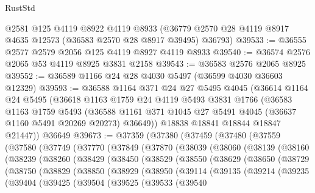 \begin{lexlean}{RustStd}
\begin{coremodule}
    @2581
    @125
    @4119
    @8922
    @4119
    @8933
    (@36779 @2570 @28 @4119 @8917 @4635 @12573 (@36583 @2570 @28 @8917 @39495) @36793)
@39533 := @36555 @2577 @2579 @2056 @125 @4119 @8927 @4119 @8933
@39540 := @36574 @2576 @2065 @53 @4119 @8925 @3831 @2158
@39543 := @36583 @2576 @2065 @8925
@39552 := @36589 @1166 @24 @28 @4030 @5497 (@36599 @4030 @36603 @12329)
@39593 := @36588
    @1164
    @371
    @24
    @27
    @5495
    @4045
    (@36614
      @1164
      @24
      @5495
      (@36618
        @1163
        @1759
        @24
        @4119
        @5493
        @3831
        @1766
        (@36583
          @1163
          @1759
          @5493
          (@36588 @1161 @371 @1045 @27 @5491 @4045 (@36637 @1160 @5491 @20269 @20273) @36649))
        @18838
        @18841
        @18844
        @18847
        @21447))
    @36649
@39673 := @37359
    (@37380
      (@37459
        (@37480
          (@37559
            (@37580
              (@37749
                (@37770
                  (@37849
                    (@37870
                      (@38039
                        (@38060
                          (@38139
                            (@38160
                              (@38239
                                (@38260
                                  (@38429
                                    (@38450
                                      (@38529
                                        (@38550
                                          (@38629
                                            (@38650
                                              (@38729
                                                (@38750
                                                  (@38829
                                                    (@38850
                                                      (@38929
                                                        (@38950
                                                          (@39114
                                                            (@39135
                                                              (@39214
                                                                (@39235
                                                                  (@39404
                                                                    (@39425
                                                                      (@39504
                                                                        (@39525
                                                                          (@39533
                                                                            (@39540

\end{coremodule}
\end{lexlean}
